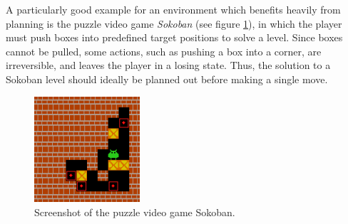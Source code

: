A particularly good example for an environment which benefits heavily from planning is the puzzle video game \textit{Sokoban} (see figure \ref{fig:sokoban}), in which the player must push boxes into predefined target positions to solve a level. Since boxes cannot be pulled, some actions, such as pushing a box into a corner, are irreversible, and leaves the player in a losing state. Thus, the solution to a Sokoban level should ideally be planned out before making a single move.
\begin{figure}[ht]
    \centering
    \includegraphics[width=0.35\textwidth]{assets/sokoban.png}
    \caption{Screenshot of the puzzle video game Sokoban. \cite{sokoban}}
    \label{fig:sokoban}
\end{figure}